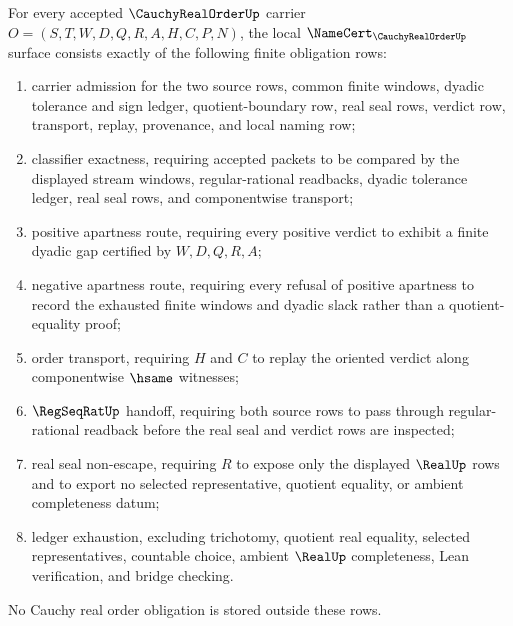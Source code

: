 \begin{theorem}
\label{thm:cauchy-real-order-namecert-obligations}
For every accepted $\CauchyRealOrderUp$ carrier $O=(S,T,W,D,Q,R,A,H,C,P,N)$, the local $\NameCert_{\CauchyRealOrderUp}$ surface consists exactly of the following finite obligation rows:
\begin{enumerate}
\item carrier admission for the two source rows, common finite windows, dyadic tolerance and sign ledger, quotient-boundary row, real seal rows, verdict row, transport, replay, provenance, and local naming row;
\item classifier exactness, requiring accepted packets to be compared by the displayed stream windows, regular-rational readbacks, dyadic tolerance ledger, real seal rows, and componentwise transport;
\item positive apartness route, requiring every positive verdict to exhibit a finite dyadic gap certified by $W,D,Q,R,A$;
\item negative apartness route, requiring every refusal of positive apartness to record the exhausted finite windows and dyadic slack rather than a quotient-equality proof;
\item order transport, requiring $H$ and $C$ to replay the oriented verdict along componentwise $\hsame$ witnesses;
\item $\RegSeqRatUp$ handoff, requiring both source rows to pass through regular-rational readback before the real seal and verdict rows are inspected;
\item real seal non-escape, requiring $R$ to expose only the displayed $\RealUp$ rows and to export no selected representative, quotient equality, or ambient completeness datum;
\item ledger exhaustion, excluding trichotomy, quotient real equality, selected representatives, countable choice, ambient $\RealUp$ completeness, Lean verification, and bridge checking.
\end{enumerate}
No Cauchy real order obligation is stored outside these rows.
\end{theorem}

